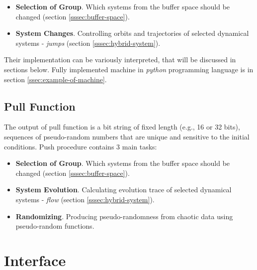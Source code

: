 \documentclass[twocolumn, a4paper, 10pt]{article}
\begin{document}
\begin{itemize}

\item\textbf{Selection of Group}. Which systems from the buffer space should be changed (section \ref{sssec:buffer-space}).

\item\textbf{System Changes}. Controlling orbits and trajectories of selected dynamical systems - \textit{jumps} (section \ref{sssec:hybrid-system}).

\end{itemize}

Their implementation can be variously interpreted, that will be discussed in sections below. Fully implemented machine in \textit{python} programming language is in section \ref{ssec:example-of-machine}.


\subsection{Pull Function}
\label{sssec:pull-function}

The output of pull function is a bit string of fixed length (e.g., 16 or 32 bits), sequences of pseudo-random numbers that are unique and sensitive to the initial conditions. Push procedure contains 3 main tasks:

\begin{itemize}

\item\textbf{Selection of Group}. Which systems from the buffer space should be changed (section \ref{sssec:buffer-space}).

\item\textbf{System Evolution}. Calculating evolution trace of selected dynamical systems - \textit{flow} (section \ref{sssec:hybrid-system}).

\item\textbf{Randomizing}. Producing pseudo-randomness from chaotic data using pseudo-random functions.

\end{itemize}


\section{Interface}
\end{document}
